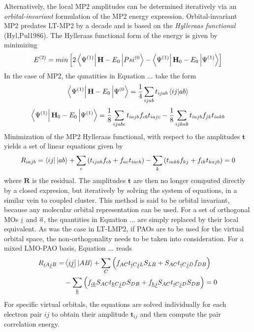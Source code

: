 Alternatively, the local MP2 amplitudes can be determined iteratively via an \emph{orbital-invariant} formulation of the MP2 energy expression. Orbital-invariant MP2 predates LT-MP2 by a decade and is based on the \emph{Hylleraas functional} (Hyl,Pul1986). The  Hylleraas functional form of the energy is given by minimizing 
\begin{equation}
E^{(2)} = min \left[ 2\bra{\Psi^{(1)}} \mathbf{H} - E_0  \ket{Psi^{(0}} - \bra{\Psi^{(1)}} \mathbf{H}_0 - E_0 \ket{\Psi^{(1)}} \right]
\end{equation}
\noindent In the case of MP2, the qunatities in Equation ... take the form
\begin{equation}
\bra{\Psi^{(1)}} \mathbf{H} - E_0  \ket{\Psi^{(0}} = \frac{1}{4} \sum_{ijab} t_{ijab} \bra{ij}\ket{ab}
\end{equation}
\begin{equation}
\bra{\Psi^{(1)}} \mathbf{H}_0 - E_0 \ket{\Psi^{(1)}} = \frac{1}{8} \sum_{ijabc} t_{iajb} f_{cb} t_{iajc} - \frac{1}{8} \sum_{ijkab} t_{iajb} f_{jk} t_{iakb}
\end{equation}
\noindent Minimization of the MP2 Hylleraas functional, with respect to the amplitudes $\mathbf{t}$ yields a set of linear equations given by
\begin{equation}
\begin{split}
R_{iajb} = \bra{ij} {} \ket{ab} + \sum_c \left(t_{ijab} f_{cb} + f_{ac} t_{iacb} \right) - \sum_k \left( t_{iakb} f_{kj} + f_{ik} t_{kajb} \right) = 0
\end{split}
\end{equation}
\noindent where $\mathbf{R}$ is the residual. The amplitudes $\mathbf{t}$ are then no longer computed directly by a closed expresion, but iteratively by solving the system of equations, in a similar vein to coupled cluster. This method is said to be orbital invariant, because any molecular orbital representation can be used. For a set of orthogonal MOs $\underline{i}$ and $\overline{a}$, the quantities in Equation ... are simply replaced by their local equivalent. As was the case in LT-LMP2, if PAOs are to be used for the virtual orbital space, the non-orthogonality needs to be taken into consideration. For a mixed LMO-PAO basis, Equation ... reads
\begin{equation}
\begin{split}
R_{\underline{i} A \underline{j} B} = & \bra{\underline{i}\underline{j}}{}\ket{AB} + \sum_C \left( f_{AC} t_{\underline{i} C \underline{j} L} S_{L B} + S_{AC} t_{\underline{i} C \underline{j} D} f_{DB} \right) \\
&-  \sum_{\underline{k}} \left( f_{\underline{i} \underline{k}} S_{AC} t_{\underline{k} C \underline{j} D} S_{D B} + f_{\underline{k} \underline{j}} S_{AC} t_{\underline{i} C \underline{j} D} S_{DB} \right) = 0
\end{split} 
\end{equation}
\noindent For specific virtual orbitals, the equations are solved individually for each electron pair $ij$ to obtain their amplitude $\mathbf{t}_{ij}$ and then compute the pair correlation energy. 

